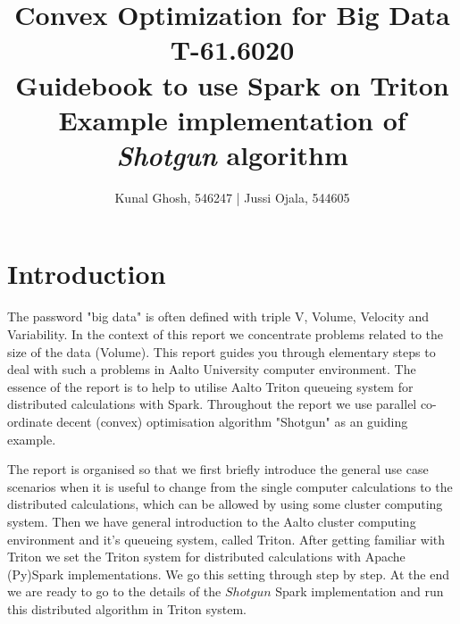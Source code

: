 \documentclass[a4paper,11pt]{article}
\begin{document}
\title{Convex Optimization for Big Data T-61.6020 \\ \vspace{8 mm}
	Guidebook to use Spark on Triton \\
	\large{  Example implementation of \textit{Shotgun} algorithm }}

    \date{}
\author{Kunal Ghosh, 546247 | Jussi Ojala, 544605} %
\maketitle
\tableofcontents

\newpage

\section{Introduction}\label{prob1}

The password "big data" is often defined with triple V, Volume, Velocity and Variability. In the context of this report we concentrate problems related to the size of the data (Volume). This report guides you through elementary steps to deal with such a problems in Aalto University computer environment. The essence of the report is to help to utilise  Aalto Triton queueing system for distributed calculations with Spark. Throughout the report we use parallel co-ordinate decent (convex) optimisation algorithm "Shotgun" as an guiding example. 

The report is organised so that we first briefly introduce the general use case scenarios when it is useful to change from the single computer calculations to the distributed calculations, which can be allowed by using some cluster computing system. Then we have general introduction to the Aalto cluster computing environment and it's queueing system, called Triton. After getting familiar with Triton we set the Triton system for distributed calculations with Apache (Py)Spark implementations. We go this setting through step by step. At the end we are ready to go to the details of the $Shotgun$ Spark implementation and run this distributed algorithm in Triton system.        
\end{document}

